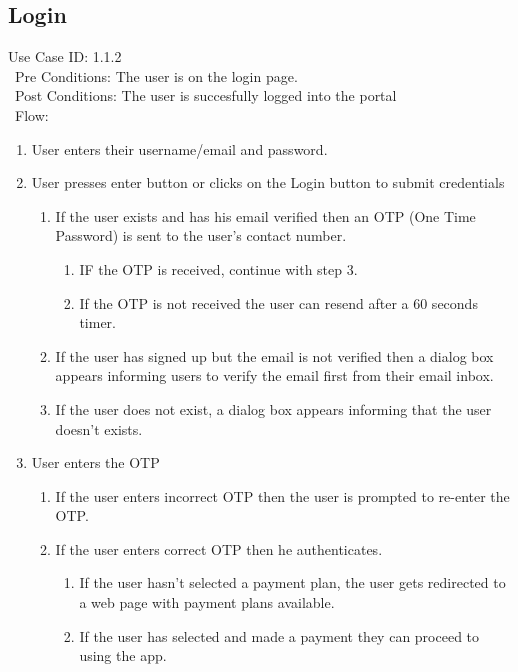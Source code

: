 \subsection{Login} 
Use Case ID: 1.1.2\\\
Pre Conditions: The user is on the login page.\\\
Post Conditions: The user is succesfully logged into the portal\\\
Flow:
\begin{enumerate}
    \item User enters their username/email and password. 
    \item User presses enter button or clicks on the Login button to submit credentials
    \begin{enumerate}
        \item If the user exists and has his email verified then an OTP (One Time Password) is sent to the user's contact number.
        \begin{enumerate}
            \item IF the OTP is received, continue with step 3.
            \item If the OTP is not received the user can resend after a 60 seconds timer.
        \end{enumerate}
        \item If the user has signed up but the email is not verified then a dialog box appears informing users to verify the email first from their email inbox.
        \item If the user does not exist, a dialog box appears informing that the user doesn't exists.
    \end{enumerate}
    \item  User enters the OTP
    \begin{enumerate}
        \item If the user enters incorrect OTP then the user is prompted to re-enter the OTP.
        \item If the user enters correct OTP then he authenticates.
        \begin{enumerate}
            \item If the user hasn't selected a payment plan, the user gets redirected to a web page with payment plans available.
            \item If the user has selected and made a payment they can proceed to using the app.
        \end{enumerate}
    \end{enumerate}
\end{enumerate}
